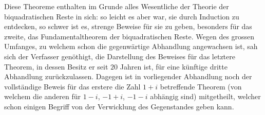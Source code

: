 Diese Theoreme enthalten im Grunde alles Wesentliche der Theorie der biquadratischen Reste in sich: so leicht es aber war, sie durch Induction zu entdecken, so schwer ist es, strenge Beweise für sie zu geben, besonders für das zweite, das Fundamentaltheorem der biquadratischen Reste. Wegen des grossen Umfanges, zu welchem schon die gegenwärtige Abhandlung angewachsen ist, sah sich der Verfasser genöthigt, die Darstellung des Beweises für das letztere Theorem, in dessen Besitz er seit $20$ Jahren ist, für eine künftige dritte Abhandlung zurückzulassen. Dagegen ist in vorliegender Abhandlung noch der vollständige Beweis für das erstere die Zahl $1+i$ betreffende Theorem (von welchem die 
%
anderen für $1-i$, $-1+i$, $-1-i$ abhängig sind) mitgetheilt, welcher schon einigen Begriff von der Verwicklung des Gegenstandes geben kann.

